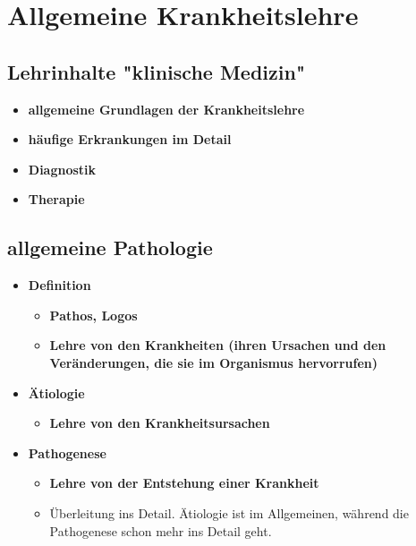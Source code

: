\section{Allgemeine Krankheitslehre}

\subsection{Lehrinhalte "klinische Medizin"}
	\begin{itemize}
		\item \textbf{allgemeine Grundlagen der Krankheitslehre}
		\item \textbf{häufige Erkrankungen im Detail}
		\item \textbf{Diagnostik}
		\item \textbf{Therapie}
	\end{itemize}

\subsection{allgemeine Pathologie}
	\begin{itemize}
		\item \textbf{Definition}
			\begin{itemize}
				\item \textbf{Pathos, Logos}
				\item \textbf{Lehre von den Krankheiten (ihren Ursachen und den  Veränderungen, die sie im Organismus hervorrufen)}
			\end{itemize}
		\item \textbf{Ätiologie}
			\begin{itemize}
				\item \textbf{Lehre von den Krankheitsursachen}
			\end{itemize}
		\item \textbf{Pathogenese}
			\begin{itemize}
				\item \textbf{Lehre von der Entstehung einer Krankheit}
				\item Überleitung ins Detail. Ätiologie ist im Allgemeinen, während die Pathogenese schon mehr ins Detail geht.
			\end{itemize}
	\end{itemize}

